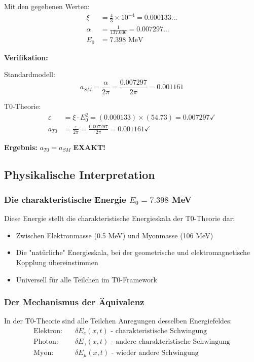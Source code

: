 \documentclass[12pt,a4paper]{article}
\numberwithin{equation}{section}
\newcommand{\xipar}{\xi}
\begin{document}
	Mit den gegebenen Werten:
	\begin{align}
		\xipar &= \frac{4}{3} \times 10^{-4} = 0.000133\ldots\\
		\alpha &= \frac{1}{137.036} = 0.007297\ldots\\
		E_0 &= 7.398 \text{ MeV}
	\end{align}
	
	\textbf{Verifikation:}
	
	Standardmodell:
	\begin{equation}
		a_{SM} = \frac{\alpha}{2\pi} = \frac{0.007297}{2\pi} = 0.001161
	\end{equation}
	
	T0-Theorie:
	\begin{align}
		\varepsilon &= \xipar \cdot E_0^2 = (0.000133) \times (54.73) = 0.007297 \checkmark\\
		a_{T0} &= \frac{\varepsilon}{2\pi} = \frac{0.007297}{2\pi} = 0.001161 \checkmark
	\end{align}
	
	\textbf{Ergebnis:} $a_{T0} = a_{SM}$ \textbf{EXAKT!}
	
	\subsection{Physikalische Interpretation}
	
	\subsubsection{Die charakteristische Energie $E_0 = 7.398$ MeV}
	
	Diese Energie stellt die charakteristische Energieskala der T0-Theorie dar:
	\begin{itemize}
		\item Zwischen Elektronmasse (0.5 MeV) und Myonmasse (106 MeV)
		\item Die "natürliche" Energieskala, bei der geometrische und elektromagnetische Kopplung übereinstimmen
		\item Universell für alle Teilchen im T0-Framework
	\end{itemize}
	
	\subsubsection{Der Mechanismus der Äquivalenz}
	
	In der T0-Theorie sind alle Teilchen Anregungen desselben Energiefeldes:
	\begin{align}
		\text{Elektron:} &\quad \delta E_e(x,t) \text{ - charakteristische Schwingung}\\
		\text{Photon:} &\quad \delta E_\gamma(x,t) \text{ - andere charakteristische Schwingung}\\
		\text{Myon:} &\quad \delta E_\mu(x,t) \text{ - wieder andere Schwingung}
	\end{align}
	
\end{document}
